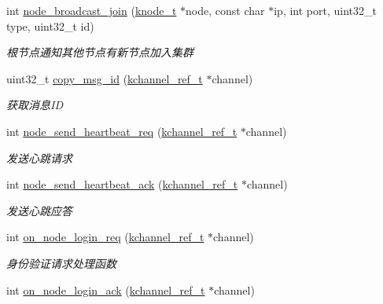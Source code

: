 \begin{DoxyCompactItemize}
int \hyperlink{a00102_a8dfe36d41c6c4a45445387aed78ef7dd_a8dfe36d41c6c4a45445387aed78ef7dd}{node\+\_\+broadcast\+\_\+join} (\hyperlink{a00066_a5e720b27efbc9ad744240f5f4233763a_a5e720b27efbc9ad744240f5f4233763a}{knode\+\_\+t} $\ast$node, const char $\ast$ip, int port, uint32\+\_\+t type, uint32\+\_\+t id)
\begin{DoxyCompactList}\small\item\em 根节点通知其他节点有新节点加入集群 \end{DoxyCompactList}\item 
uint32\+\_\+t \hyperlink{a00102_a0348f37c23e35fb569269dbe683296c8_a0348f37c23e35fb569269dbe683296c8}{copy\+\_\+msg\+\_\+id} (\hyperlink{a00066_a3b7e82599367eade261456f60ebe2cd9_a3b7e82599367eade261456f60ebe2cd9}{kchannel\+\_\+ref\+\_\+t} $\ast$channel)
\begin{DoxyCompactList}\small\item\em 获取消息\+I\+D \end{DoxyCompactList}\item 
int \hyperlink{a00102_acb8219f989e66e827adc668bb0bb3649_acb8219f989e66e827adc668bb0bb3649}{node\+\_\+send\+\_\+heartbeat\+\_\+req} (\hyperlink{a00066_a3b7e82599367eade261456f60ebe2cd9_a3b7e82599367eade261456f60ebe2cd9}{kchannel\+\_\+ref\+\_\+t} $\ast$channel)
\begin{DoxyCompactList}\small\item\em 发送心跳请求 \end{DoxyCompactList}\item 
int \hyperlink{a00102_a25f4321eb35ddd75d6e026a0055ade30_a25f4321eb35ddd75d6e026a0055ade30}{node\+\_\+send\+\_\+heartbeat\+\_\+ack} (\hyperlink{a00066_a3b7e82599367eade261456f60ebe2cd9_a3b7e82599367eade261456f60ebe2cd9}{kchannel\+\_\+ref\+\_\+t} $\ast$channel)
\begin{DoxyCompactList}\small\item\em 发送心跳应答 \end{DoxyCompactList}\item 
int \hyperlink{a00102_a8265131106d1be7979dbe768f90201b2_a8265131106d1be7979dbe768f90201b2}{on\+\_\+node\+\_\+login\+\_\+req} (\hyperlink{a00066_a3b7e82599367eade261456f60ebe2cd9_a3b7e82599367eade261456f60ebe2cd9}{kchannel\+\_\+ref\+\_\+t} $\ast$channel)
\begin{DoxyCompactList}\small\item\em 身份验证请求处理函数 \end{DoxyCompactList}\item 
int \hyperlink{a00102_a631409526fc946adb7f023a17d33cbae_a631409526fc946adb7f023a17d33cbae}{on\+\_\+node\+\_\+login\+\_\+ack} (\hyperlink{a00066_a3b7e82599367eade261456f60ebe2cd9_a3b7e82599367eade261456f60ebe2cd9}{kchannel\+\_\+ref\+\_\+t} $\ast$channel)

\end{DoxyCompactItemize}
